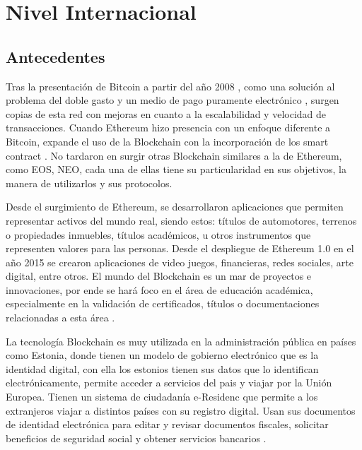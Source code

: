 \section{Nivel Internacional}

\subsection{Antecedentes}
Tras la presentación de Bitcoin a partir del año 2008 \cite[]{alice_blockchain_2021}, como una solución al problema del doble gasto y un medio de pago puramente electrónico \cite[]{nakamoto_bitcoin_2008},
surgen copias de esta red con mejoras en cuanto a la escalabilidad y velocidad de transacciones. Cuando Ethereum hizo presencia  con
un enfoque diferente a Bitcoin, expande el uso de la Blockchain
con la incorporación de los smart contract \cite[]{ethereum_que_2020}.  %
No tardaron en surgir otras  Blockchain similares a la de Ethereum, como EOS, 
NEO,  cada una de ellas  tiene su particularidad en sus objetivos, la manera de utilizarlos y sus protocolos.

Desde el surgimiento de Ethereum, se  desarrollaron aplicaciones que permiten
representar activos del mundo real, siendo estos: títulos de automotores, terrenos o propiedades inmuebles,
títulos académicos, u otros instrumentos que representen valores para las personas.
Desde el despliegue de Ethereum 1.0 en el año 2015 se crearon  aplicaciones de video juegos,
financieras, redes sociales, arte digital, entre otros. El mundo del  Blockchain es un mar de proyectos e innovaciones,
por ende se hará foco en el área de educación académica, especialmente
en la validación de certificados, títulos o documentaciones relacionadas a esta
área \cite[]{drescher_Blockchain_2017,cheng_Blockchain_2018}.



La tecnología Blockchain es muy utilizada en la administración pública en países como Estonia, 
donde tienen un modelo de gobierno electrónico que es la identidad digital, con ella los estonios tienen sus datos
que lo identifican electrónicamente, permite  acceder a servicios del pais y viajar por la Unión Europea.   
Tienen un sistema de ciudadanía e-Residenc que permite a los extranjeros  viajar a distintos países con su
registro digital. Usan sus documentos de identidad electrónica para editar y revisar 
documentos fiscales, solicitar beneficios de seguridad social y obtener servicios bancarios \cite[]{brys_cadena_2019}.

